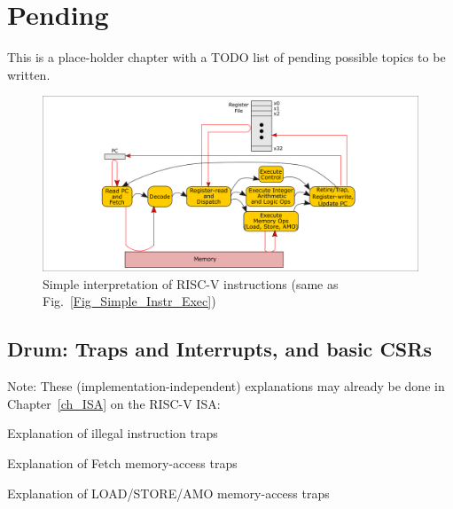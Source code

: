 

\chapter{Pending}


\setcounter{page}{1}
\renewcommand{\thepage}{\arabic{chapter}-\arabic{page}}

\label{ch_Pending}


This is a place-holder chapter with a TODO list of pending possible
topics to be written.

\begin{figure}[htbp]
  \centerline{\includegraphics[width=6in,angle=0]{ch030_RISCV_Design_Space/Figures/Fig_Simple_Instr_Exec}}
  \caption{\label{Fig_Pending_Simple_Instr_Exec}Simple interpretation of RISC-V instructions (same as Fig.~\ref{Fig_Simple_Instr_Exec})}
\end{figure}

\hdivider


\section{Drum: Traps and Interrupts, and basic CSRs}

Note: These (implementation-independent) explanations may already be
done in Chapter~\ref{ch_ISA} on the RISC-V ISA:

\begin{tightlist}
  \item Explanation of illegal instruction traps
  \item Explanation of Fetch memory-access traps
  \item Explanation of LOAD/STORE/AMO memory-access traps
\end{tightlist}

